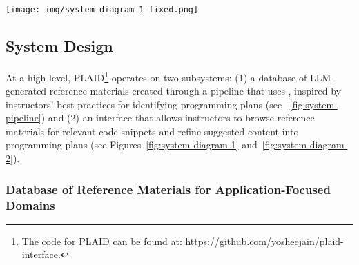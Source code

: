 

\begin{figure*}[h]
        \texttt{[image: img/system-diagram-1-fixed.png]}
        \caption{Plan Identification using PLAID: (a) list of example programs for instructors organized by natural language descriptions, (b) list of full programs of code, (c) search bar enabling easy navigation of given content to find code for specific ideas, (d) button to create a plan using the selected part of the code, (e) button to create a plan using the complete example program, (f) button to view an explanation for a selected code snippet, and (g) button for executing the selected code.}
        \label{fig:system-diagram-1}
\end{figure*}

\subsection{System Design}

At a high level, PLAID\footnote{The code for PLAID can be found at: https://github.com/yosheejain/plaid-interface.} operates on two subsystems: (1) a database of LLM-generated reference materials created through a pipeline that uses , inspired by instructors' best practices for identifying programming plans (see ~\cref{fig:system-pipeline})
and (2) an interface that allows instructors to browse reference materials for relevant code snippets 
and refine suggested content into programming plans
(see Figures~\ref{fig:system-diagram-1} and~\ref{fig:system-diagram-2}).



\subsubsection{Database of Reference Materials for Application-Focused Domains}

